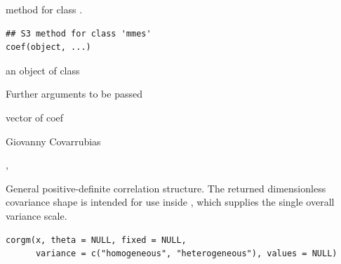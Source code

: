 \documentclass[a4paper]{book}
\begin{document}
%
\begin{Description}\relax
{} method for class .
\end{Description}
%
\begin{Usage}
\begin{verbatim}
## S3 method for class 'mmes'
coef(object, ...)
\end{verbatim}
\end{Usage}
%
\begin{Arguments}
\begin{ldescription}
\item[\code{object}] an object of class 
\item[\code{...}] Further arguments to be passed
\end{ldescription}
\end{Arguments}
%
\begin{Value}
vector of coef

\end{Value}
%
\begin{Author}\relax
Giovanny Covarrubias
\end{Author}
%
\begin{SeeAlso}\relax
{},  
\end{SeeAlso}
%
\begin{Description}\relax
General positive-definite correlation structure. The returned dimensionless covariance shape is intended for use inside , which supplies the single overall variance scale.
\end{Description}
%
\begin{Usage}
\begin{verbatim}
corgm(x, theta = NULL, fixed = NULL,
      variance = c("homogeneous", "heterogeneous"), values = NULL)
\end{verbatim}
\end{Usage}
%
\end{document}
